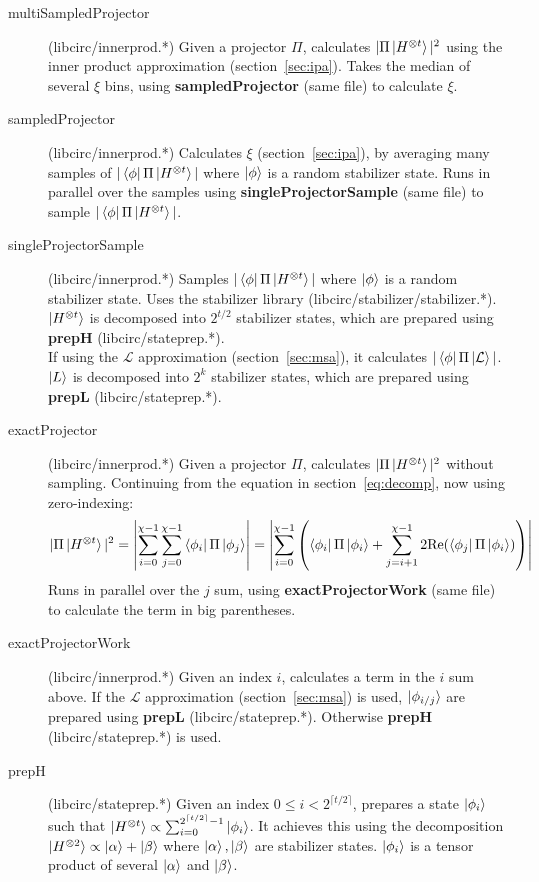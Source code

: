 \documentclass[11pt]{article}
\begin{document}
\begin{description}
    \item[multiSampledProjector] (libcirc/innerprod.*) Given a projector $\Pi$, calculates $|\Pi\ket{H^{\otimes t}}|^2$ using the inner product approximation (section~\ref{sec:ipa}). Takes the median of several $\xi$ bins, using \textbf{sampledProjector} (same file) to calculate $\xi$.
    \item[sampledProjector] (libcirc/innerprod.*) Calculates $\xi$ (section~\ref{sec:ipa}), by averaging many samples of $|\bra{\phi}\Pi\ket{H^{\otimes t}}|$ where $\ket{\phi}$ is a random stabilizer state. Runs in parallel over the samples using \textbf{singleProjectorSample} (same file) to sample $|\bra{\phi}\Pi\ket{H^{\otimes t}}|$.
    \item[singleProjectorSample] (libcirc/innerprod.*) Samples $|\bra{\phi}\Pi\ket{H^{\otimes t}}|$ where $\ket{\phi}$ is a random stabilizer state. Uses the stabilizer library (libcirc/stabilizer/stabilizer.*). $\ket{H^{\otimes t}}$ is decomposed into $2^{t/2}$ stabilizer states, which are prepared using \textbf{prepH} (libcirc/stateprep.*).\\ If using the $\mathcal{L}$ approximation (section~\ref{sec:msa}), it calculates $|\bra{\phi}\Pi\ket{\mathcal{L}}|$. $\ket{L}$ is decomposed into $2^k$ stabilizer states, which are prepared using \textbf{prepL} (libcirc/stateprep.*).



    \item[exactProjector] (libcirc/innerprod.*) Given a projector $\Pi$, calculates $|\Pi\ket{H^{\otimes t}}|^2$ without sampling. Continuing from the equation in section~\ref{eq:decomp}, now using zero-indexing:
        $$ |\Pi\ket{H^{\otimes t}}|^2 = \left| \sum^{\chi-1}_{i=0} \sum^{\chi-1}_{j=0}\bra{\phi_i}\Pi\ket{\phi_j}\right| = \left| \sum^{\chi-1}_{i=0}\left( \bra{\phi_i}\Pi\ket{\phi_i} + \sum^{\chi-1}_{j=i+1}2\text{Re}( \bra{\phi_j}\Pi\ket{\phi_i})\right)\right| $$
        Runs in parallel over the $j$ sum, using \textbf{exactProjectorWork} (same file) to calculate the term in big parentheses.

    \item[exactProjectorWork] (libcirc/innerprod.*) Given an index $i$, calculates a term in the $i$ sum above. If the $\mathcal{L}$ approximation (section~\ref{sec:msa}) is used, $\ket{\phi_{i/j}}$ are prepared using \textbf{prepL} (libcirc/stateprep.*). Otherwise \textbf{prepH} (libcirc/stateprep.*) is used.

    \item[prepH] (libcirc/stateprep.*) Given an index $0 \leq i < 2^{\lceil t/2\rceil}$, prepares a state $\ket{\phi_i}$ such that $\ket{H^{\otimes t}} \propto \sum_{i=0}^{2^{\lceil t/2 \rceil}-1} \ket{\phi_i} $. It achieves this using the decomposition $\ket{H^{\otimes 2}} \propto \ket{\alpha} + \ket{\beta}$ where $\ket{\alpha},\ket{\beta}$ are stabilizer states. $\ket{\phi_i}$ is a tensor product of several $\ket{\alpha}$ and $\ket{\beta}$. 
    

\end{description}
\end{document}
